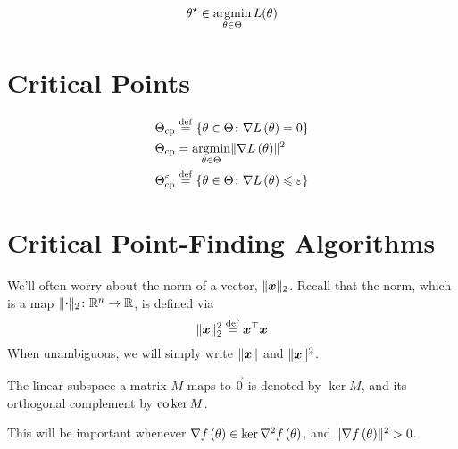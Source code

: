 \documentclass[../../thesis.tex]{subfiles}
\begin{document}
\begin{align}
	\theta^\star \in \argmin_{\theta \in \Theta} L(\theta)\equationlabel{erm}
\end{align}

\section{Critical Points}

\begin{align}
	\Theta_{\textrm{cp}} &\stackrel{\small \mathrm{def}}{=} \left\{\theta \in \Theta \colon \nabla L\left(\theta\right) = 0\right\}\\
	\Theta_{\textrm{cp}} &= \mathop{\mathrm{argmin}}_{\theta \in \Theta} \lVert\nabla L\left(\theta\right)\rVert^2\\
	\Theta^\varepsilon_{\textrm{cp}} &\stackrel{\small \mathrm{def}}{=} \left\{\theta \in \Theta \colon \nabla L\left(\theta\right) \leqslant \varepsilon\right\}\\
\end{align}

\section{Critical Point-Finding Algorithms}
We'll often worry about the norm of a vector,
$\lVert{\bm{x}}\rVert_{\scriptstyle2}$.
Recall that the norm, which is a map
$\lVert\cdot\rVert_{\scriptstyle2} \colon \mathbb{R}^n \to \mathbb{R}$,
is defined via
\[
	\lVert{\bm{x}}\rVert_{\scriptstyle2}^2 \stackrel{\small \mathrm{def}}{=} {{\bm{x}}^\top}{\bm{x}}
\]
When unambiguous, we will simply write $\lVert{\bm{x}}\rVert$
and $\lVert{\bm{x}}\rVert^2$.

The linear subspace a matrix $M$ maps to $\vec{0}$
is denoted by $\ker{M}$,
and its orthogonal complement by $\operatorname*{co}{\ker{M}}$.

This will be important whenever
$\nabla f\left(\theta\right) \in \ker\nabla^2f\left(\theta\right)$,
and
$\lVert\nabla f\left(\theta\right)\rVert^2 > 0$.

\onlyinsubfile{\printbibliography}
\end{document}
